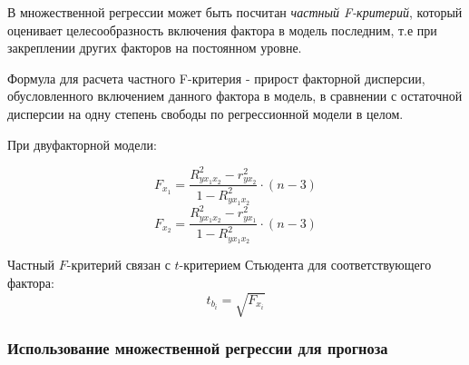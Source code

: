 \documentclass[aps,%
12pt,%
final,%
oneside,
onecolumn,%
musixtex, %
superscriptaddress,%
centertags]{article} %
\begin{document}
В множественной регрессии может быть посчитан \textit{частный F-критерий}, который оценивает целесообразность включения фактора в модель последним, т.е при закреплении других факторов на постоянном уровне.

Формула для расчета частного F-критерия - прирост факторной дисперсии, обусловленного включением данного фактора в модель, в сравнении с остаточной дисперсии на одну степень свободы по регрессионной модели в целом.

При двуфакторной модели:

$$F_{x_1} = \frac{R_{yx_1x_2}^2 - r_{yx_2}^2}{1-R_{yx_1x_2}^2} \cdot (n-3)$$
$$F_{x_2} = \frac{R_{yx_1x_2}^2 - r_{yx_1}^2}{1-R_{yx_1x_2}^2} \cdot (n-3)$$

Частный $F$-критерий связан с $t$-критерием Стьюдента для соответствующего фактора:
$$ t_{b_i} = \sqrt{F_{x_i}}$$

\subsubsection{Использование множественной регрессии для прогноза}
\end{document}
